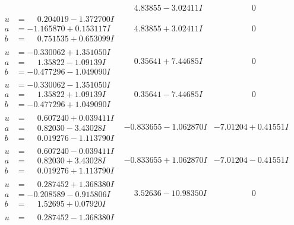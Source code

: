 \documentclass[1p]{elsarticle_modified}
\theoremstyle{definition}
\begin{document}
$$\begin{array}{c|c|c}
 & \phantom{-}4.83855 - 3.02411 I & \phantom{-0.000000 } 0 \\ \hline\begin{aligned}
u &= \phantom{-}0.204019 - 1.372700 I \\
a &= -1.165870 + 0.153117 I \\
b &= \phantom{-}0.751535 + 0.653099 I\end{aligned}
 & \phantom{-}4.83855 + 3.02411 I & \phantom{-0.000000 } 0 \\ \hline\begin{aligned}
u &= -0.330062 + 1.351050 I \\
a &= \phantom{-}1.35822 - 1.09139 I \\
b &= -0.477296 - 1.049090 I\end{aligned}
 & \phantom{-}0.35641 + 7.44685 I & \phantom{-0.000000 } 0 \\ \hline\begin{aligned}
u &= -0.330062 - 1.351050 I \\
a &= \phantom{-}1.35822 + 1.09139 I \\
b &= -0.477296 + 1.049090 I\end{aligned}
 & \phantom{-}0.35641 - 7.44685 I & \phantom{-0.000000 } 0 \\ \hline\begin{aligned}
u &= \phantom{-}0.607240 + 0.039411 I \\
a &= \phantom{-}0.82030 - 3.43028 I \\
b &= \phantom{-}0.019276 - 1.113790 I\end{aligned}
 & -0.833655 - 1.062870 I & -7.01204 + 0.41551 I \\ \hline\begin{aligned}
u &= \phantom{-}0.607240 - 0.039411 I \\
a &= \phantom{-}0.82030 + 3.43028 I \\
b &= \phantom{-}0.019276 + 1.113790 I\end{aligned}
 & -0.833655 + 1.062870 I & -7.01204 - 0.41551 I \\ \hline\begin{aligned}
u &= \phantom{-}0.287452 + 1.368380 I \\
a &= -0.208589 - 0.915806 I \\
b &= \phantom{-}1.52695 + 0.07920 I\end{aligned}
 & \phantom{-}3.52636 - 10.98350 I & \phantom{-0.000000 } 0 \\ \hline\begin{aligned}
u &= \phantom{-}0.287452 - 1.368380 I \\

\end{aligned}
\end{array}$$
\end{document}
